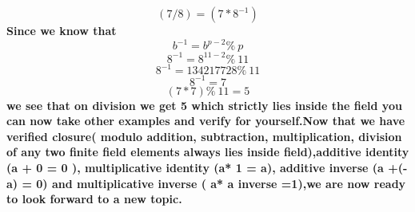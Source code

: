 \documentclass{article}
\begin{document}
\textbf {\[(7/8) = (7 * 8^{-1})\]}
\textbf { Since we know that }
\textbf {\[b^{-1} = b ^{p-2} \%\ p \]}
\textbf {\[8 ^{-1} = 8 ^{11-2} \%\ 11 \]}
\textbf {\[8 ^{-1} = 134217728 \%\ 11 \]}
\textbf {\[8 ^{-1} = 7 \]}
\textbf {\[(7* 7) \%\ 11 = 5\]}
\textbf { we see that on division we get 5 which strictly lies inside the field you can now take other examples and verify for yourself.Now that we have verified closure( modulo addition, subtraction, multiplication, division of any two finite field elements always lies inside field),additive identity (a + 0 = 0 ), multiplicative identity (a* 1 = a), additive inverse (a +(-a) = 0) and multiplicative inverse ( a* a inverse =1),we are now ready to look forward to a new topic. }

\pagebreak
\end{document}
